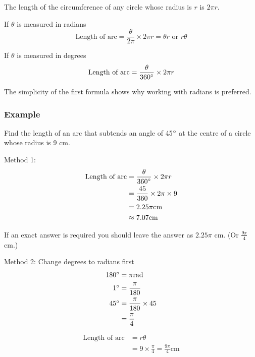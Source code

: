 The length of the circumference of any circle whose radius is $r$ is $2 \pi  r$. 

If $\theta $ is measured in radians
\begin{equation*}\text{Length of arc} =\frac{\theta }{2 \pi } \times 2 \pi  r =\theta  r\text{ or }r \theta 
\end{equation*}

If $\theta $ is measured in degrees
\begin{equation*}\text{Length of arc} =\frac{\theta }{360 \mbox{{\ensuremath{{}^\circ}}}} \times 2 \pi  r
\end{equation*}

The simplicity of the first formula shows why working with radians is preferred. 

\subsubsection{Example}
Find the length of an arc that subtends an angle of 45$\mbox{{\ensuremath{{}^\circ}}}$ at the centre of a circle whose radius is 9 $\mbox{cm}\text{.}$ 

Method 1:
\begin{align*}\text{Length of arc} &  =  \frac{\theta }{360 \mbox{{\ensuremath{{}^\circ}}}} \times 2 \pi  r \\
 &  =  \frac{45}{360} \times 2 \pi  \times 9 \\
 &  =  2.25 \pi \text{}\mbox{cm} \\
 &  \approx   7.07\text{}\mbox{cm}\end{align*}

If an exact answer is required you should leave the answer as $2.25 \pi $ $\mbox{cm}$. (Or $\frac{9 \pi }{4}$ $\mbox{cm}\text{.}$) 

Method 2: Change degrees to radians first
\begin{align*}180 \mbox{{\ensuremath{{}^\circ}}} &  =  \pi \text{}\mbox{rad} \\
1 \mbox{{\ensuremath{{}^\circ}}} &  =  \frac{\pi }{180} \\
45 \mbox{{\ensuremath{{}^\circ}}} &  =  \frac{\pi }{180} \times 45 \\
 &  =  \frac{\pi }{4}\end{align*}


\begin{align*}\text{Length of arc} &  =  r \theta  \\
 &  =  9 \times \frac{\pi }{4} =\frac{9 \pi }{4}\text{}\mbox{cm}\end{align*}


